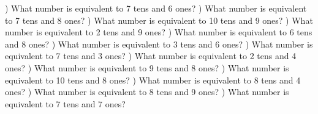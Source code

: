\documentclass{article}%
\begin{document}
\newline%
) What number is equivalent to 7 tens and 6 ones?%
\newline%
\newline%
) What number is equivalent to 7 tens and 8 ones?%
\newline%
\newline%
) What number is equivalent to 10 tens and 9 ones?%
\newline%
\newline%
) What number is equivalent to 2 tens and 9 ones?%
\newline%
\newline%
) What number is equivalent to 6 tens and 8 ones?%
\newline%
\newline%
) What number is equivalent to 3 tens and 6 ones?%
\newline%
\newline%
) What number is equivalent to 7 tens and 3 ones?%
\newline%
\newline%
) What number is equivalent to 2 tens and 4 ones?%
\newline%
\newline%
) What number is equivalent to 9 tens and 8 ones?%
\newline%
\newline%
) What number is equivalent to 10 tens and 8 ones?%
\newline%
\newline%
) What number is equivalent to 8 tens and 4 ones?%
\newline%
\newline%
) What number is equivalent to 8 tens and 9 ones?%
\newline%
\newline%
) What number is equivalent to 7 tens and 7 ones?%
\newline%
\end{document}
